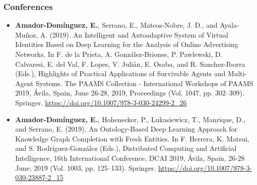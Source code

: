 \subsubsection*{Conferences}
\begin{itemize}
    \item \textbf{Amador-Domínguez, E.}, Serrano, E., Mateos-Nobre, J. D., and Ayala-Muñoz, A. (2019). An Intelligent and Autoadaptive System of Virtual Identities Based on Deep Learning for the Analysis of Online Advertising Networks. In F. de la Prieta, A. González-Briones, P. Pawlewski, D. Calvaresi, E. del Val, F. Lopes, V. Julián, E. Osaba, and R. Sanchez-Iborra (Eds.), Highlights of Practical Applications of Survivable Agents and Multi-Agent Systems. The PAAMS Collection - International Workshops of PAAMS 2019, Ávila, Spain, June 26-28, 2019, Proceedings (Vol. 1047, pp. 302–309). Springer. \url{https://doi.org/10.1007/978-3-030-24299-2\_26} 
    
    \item \textbf{Amador-Domínguez, E.}, Hohenecker, P., Lukasiewicz, T., Manrique, D., and Serrano, E. (2019). An Ontology-Based Deep Learning Approach for Knowledge Graph Completion with Fresh Entities. In F. Herrera, K. Matsui, and S. Rodríguez-González (Eds.), Distributed Computing and Artificial Intelligence, 16th International Conference, DCAI 2019, Ávila, Spain, 26-28 June, 2019 (Vol. 1003, pp. 125–133). Springer. 
    \url{https://doi.org/10.1007/978-3-030-23887-2\_15} 
\end{itemize}
